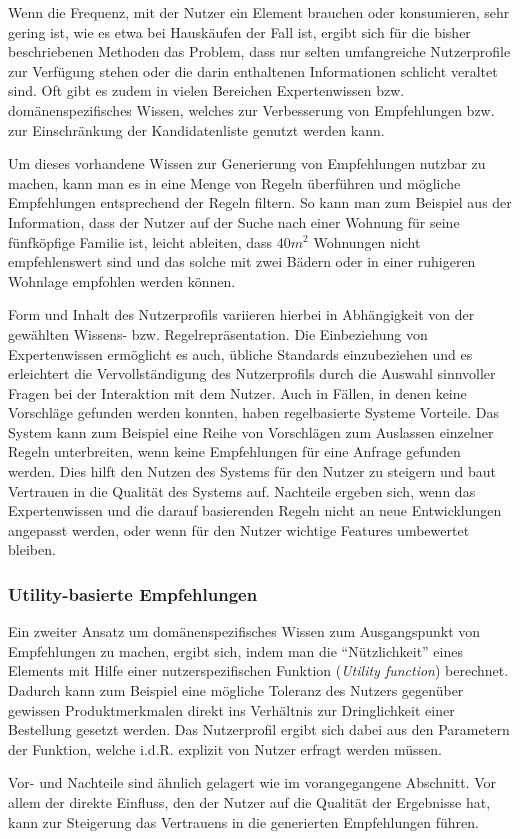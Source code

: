 Wenn die Frequenz, mit der Nutzer ein Element brauchen oder konsumieren, sehr gering ist, wie es etwa bei Hauskäufen der Fall ist, ergibt sich für die bisher beschriebenen Methoden das Problem, dass nur selten umfangreiche Nutzerprofile zur Verfügung stehen oder die darin enthaltenen Informationen schlicht veraltet sind. Oft gibt es zudem in vielen Bereichen Expertenwissen bzw. domänenspezifisches Wissen, welches zur Verbesserung von Empfehlungen bzw. zur Einschränkung der Kandidatenliste genutzt werden kann.

Um dieses vorhandene Wissen zur Generierung von Empfehlungen nutzbar zu machen, kann man es in eine Menge von Regeln überführen und mögliche Empfehlungen entsprechend der Regeln filtern. So kann man zum Beispiel aus der Information, dass der Nutzer auf der Suche nach einer Wohnung für seine fünfköpfige Familie ist, leicht ableiten, dass 40$m^{2}$ Wohnungen nicht empfehlenswert sind und das solche mit zwei Bädern oder in einer ruhigeren Wohnlage empfohlen werden können.

Form und Inhalt des Nutzerprofils variieren hierbei in Abhängigkeit von der gewählten Wissens- bzw. Regelrepräsentation. Die Einbeziehung von Expertenwissen ermöglicht es auch, übliche Standards einzubeziehen und es erleichtert die Vervollständigung des Nutzerprofils durch die Auswahl sinnvoller Fragen bei der Interaktion mit dem Nutzer. Auch in Fällen, in denen keine Vorschläge gefunden werden konnten, haben regelbasierte Systeme Vorteile. Das System kann zum Beispiel eine Reihe von Vorschlägen zum Auslassen einzelner Regeln unterbreiten, wenn keine Empfehlungen für eine Anfrage gefunden werden. Dies hilft den Nutzen des Systems für den Nutzer zu steigern und baut Vertrauen in die Qualität des Systems auf. Nachteile ergeben sich, wenn das Expertenwissen und die darauf basierenden Regeln nicht an neue Entwicklungen angepasst werden, oder wenn für den Nutzer wichtige Features umbewertet bleiben. \citep[Kap. 4]{rs}

\subsubsection{Utility-basierte Empfehlungen}

Ein zweiter Ansatz um domänenspezifisches Wissen zum Ausgangspunkt von Empfehlungen zu machen, ergibt sich, indem man die ``Nützlichkeit'' eines Elements mit Hilfe einer nutzerspezifischen Funktion (\textit{Utility function}) berechnet. Dadurch kann zum Beispiel eine mögliche Toleranz des Nutzers gegenüber gewissen Produktmerkmalen direkt ins Verhältnis zur Dringlichkeit einer Bestellung gesetzt werden. Das Nutzerprofil ergibt sich dabei aus den Parametern der Funktion, welche i.d.R. explizit von Nutzer erfragt werden müssen.

Vor- und Nachteile sind ähnlich gelagert wie im vorangegangene Abschnitt. Vor allem der direkte Einfluss, den der Nutzer auf die Qualität der Ergebnisse hat, kann zur Steigerung das Vertrauens in die generierten Empfehlungen führen.  \citep[Kap. 1]{hb} \citep{Burke:2002:HRS:586321.586352, hb_20}





